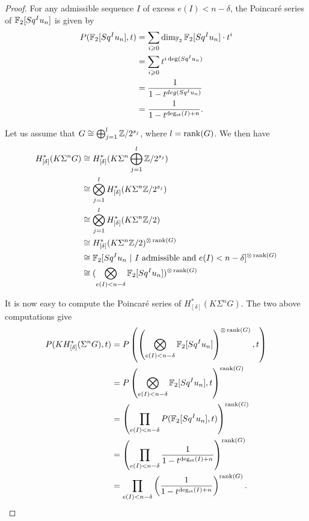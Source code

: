 \begin{proof}
For any admissible sequence $I$ of excess $e(I)<n-\delta$, the Poincar\'e series of $\mathbb{F}_2[Sq^I u_n]$ is given by
\begin{align*}
P(\mathbb{F}_2[Sq^I u_n],t)&=\sum_{i\geqslant0}\dim_{\mathbb{F}_2}\mathbb{F}_2[Sq^I u_n]\cdot t^i\\
&=\sum_{i\geqslant0}t^{i\deg(Sq^I u_n)}\\
&=\frac{1}{1-t^{deg(Sq^I u_n)}}\\
&=\frac{1}{1-t^{\operatorname{deg_{st}}(I)+n}}.\\
\end{align*}

Let us assume that $G\cong\bigoplus_{j=1}^l\mathbb{Z}/2^{s_j}$, where $l=\operatorname{rank}(G)$. We then have
\begin{align*}
H^*_{[\delta]}(K\Sigma^n G)&\cong H^*_{[\delta]}(K\Sigma^n\bigoplus_{j=1}^l\mathbb{Z}/2^{s_j})\\
&\cong\bigotimes_{j=1}^l H^*_{[\delta]}(K\Sigma^n \mathbb{Z}/2^{s_j})\\
&\cong\bigotimes_{j=1}^l H^*_{[\delta]}(K\Sigma^n \mathbb{Z}/2)\\
&\cong H^*_{[\delta]}(K\Sigma^n \mathbb{Z}/2)^{\otimes\operatorname{rank}(G)}\\
&\cong \mathbb{F}_2[Sq^I u_n\ |\ \text{$I$ admissible and $e(I)<n-\delta$}]^{\otimes\operatorname{rank}(G)}\\
&\cong (\bigotimes_{e(I)<n-\delta}\mathbb{F}_2[Sq^I u_n])^{\otimes\operatorname{rank}(G)}
\end{align*}

It is now easy to compute the Poincar\'e series of $H^*_{[\delta]}(K\Sigma^n G)$. The two above computations give
\begin{align*}
P(KH^*_{[\delta]}(\Sigma^n G),t)&=P\left(\left(\bigotimes_{e(I)<n-\delta}\mathbb{F}_2[Sq^I u_n]\right)^{\otimes\operatorname{rank}(G)},t\right)\\
&=P\left(\bigotimes_{e(I)<n-\delta}\mathbb{F}_2[Sq^I u_n],t\right)^{\operatorname{rank}(G)}\\
&=\left(\prod_{e(I)<n-\delta}P(\mathbb{F}_2[Sq^I u_n],t)\right)^{\operatorname{rank}(G)}\\
&=\left(\prod_{e(I)<n-\delta}\frac{1}{1-t^{\operatorname{deg_{st}}(I)+n}}\right)^{\operatorname{rank}(G)}\\
&=\prod_{e(I)<n-\delta}\left(\frac{1}{1-t^{\operatorname{deg_{st}}(I)+n}}\right)^{\operatorname{rank}(G)}.
\end{align*}


\end{proof}
